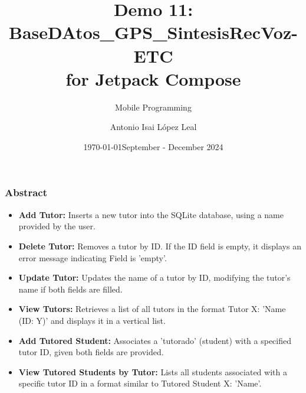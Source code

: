 \documentclass[pdf,
serif,
compress,
xcolor=table,
dvipsnames,
spanish,
aspectratio=169]{beamer}
\date{\specialdate\today}
\title[Arrays]{Demo 11: BaseDAtos\_GPS\_SintesisRecVoz-ETC \\for
Jetpack Compose}
\subtitle[short]{Mobile Programming}
\author[-]{Antonio Isai López Leal}
\institute[UPV]{Polytechnic University of Victoria}
\date[]{September - December 2024}
\begin{document}
\begin{frame}
    \titlepage
\end{frame}

%
\begin{frame}[fragile]
    \frametitle{Abstract}

    \begin{itemize} \item \textbf{Add Tutor:} Inserts a new tutor into the SQLite database, using a name provided by the user. \item \textbf{Delete Tutor:} Removes a tutor by ID. If the ID field is empty, it displays an error message indicating Field is 'empty'. \item \textbf{Update Tutor:} Updates the name of a tutor by ID, modifying the tutor's name if both fields are filled. \item \textbf{View Tutors:} Retrieves a list of all tutors in the format Tutor X: 'Name (ID: Y)' and displays it in a vertical list. \item \textbf{Add Tutored Student:} Associates a 'tutorado' (student) with a specified tutor ID, given both fields are provided. \item \textbf{View Tutored Students by Tutor:} Lists all students associated with a specific tutor ID in a format similar to Tutored Student X: 'Name'. 
    \end{itemize}
    
\end{frame}
%
\end{document}
